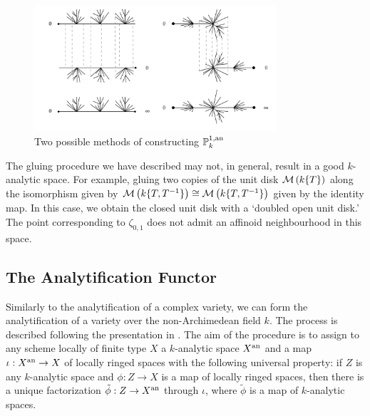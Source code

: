 \begin{figure}[!ht]
    \centering
    \includegraphics[width=0.8\textwidth]{Images/projspace.png}
    \caption{Two possible methods of constructing $\mathbb{P}^{1, \text{an}}_{k}$}
    \label{fig:projline}
\end{figure}

The gluing procedure we have described may not, in general, result in a good $k$-analytic space.
For example, gluing two copies of the unit disk $\mathcal{M}\left(k\{T\}\right)$ along the isomorphism given by $\mathcal{M}\left(k\{T, T^{-1}\}\right) \cong \mathcal{M}\left(k\{T, T^{-1}\}\right)$ given by the identity map.
In this case, we obtain the closed unit disk with a `doubled open unit disk.'
The point corresponding to $\zeta_{0, 1}$ does not admit an affinoid neighbourhood in this space.

\subsection{The Analytification Functor}

Similarly to the analytification of a complex variety, we can form the analytification of a variety over the non-Archimedean field $k$. The process is described following the presentation in \parencite[\S 3.4]{berk1}. The aim of the procedure is to assign to any scheme locally of finite type $X$ a $k$-analytic space $X^{\text{an}}$ and a map $\iota: X^{\text{an}} \to X$ of locally ringed spaces with the following universal property: if $Z$ is any $k$-analytic space and $\phi: Z \to X$ is a map of locally ringed spaces, then there is a unique factorization $\tilde{\phi}: Z \to X^{\text{an}}$ through $\iota$, where $\tilde{\phi}$ is a map of $k$-analytic spaces.

